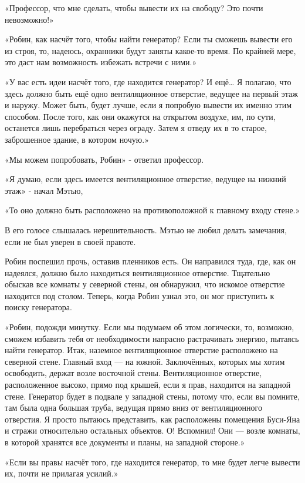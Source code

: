 \documentclass[a4paper,12pt]{book}
\begin{document}
\par
«Профессор, что мне сделать, чтобы вывести их на свободу? Это почти невозможно!»
\par
«Робин, как насчёт того, чтобы найти генератор? Если ты сможешь вывести его из строя, то, надеюсь, охранники будут заняты какое-то время. По крайней мере, это даст нам возможность избежать встречи с ними.»
\par
«У вас есть идеи насчёт того, где находится генератор? И ещё… Я полагаю, что здесь должно быть ещё одно вентиляционное отверстие, ведущее на первый этаж и наружу. Может быть, будет лучше, если я попробую вывести их именно этим способом. После того, как они окажутся на открытом воздухе, им, по сути, останется лишь перебраться через ограду. Затем я отведу их в то старое, заброшенное здание, в котором ночую.»
\par
«Мы можем попробовать, Робин» - ответил профессор.
\par
«Я думаю, если здесь имеется вентиляционное отверстие, ведущее на нижний этаж» - начал Мэтью,
\par
«То оно должно быть расположено на противоположной к главному входу стене.»
\par
В его голосе слышалась нерешительность. Мэтью не любил делать замечания, если не был уверен в своей правоте.
\par
Робин поспешил прочь, оставив пленников есть. Он направился туда, где, как он надеялся, должно было находиться вентиляционное отверстие. Тщательно обыскав все комнаты у северной стены, он обнаружил, что искомое отверстие находится под столом. Теперь, когда Робин узнал это, он мог приступить к поиску генератора.
\par
«Робин, подожди минутку. Если мы подумаем об этом логически, то, возможно, сможем избавить тебя от необходимости напрасно растрачивать энергию, пытаясь найти генератор. Итак, наземное вентиляционное отверстие расположено на северной стене. Главный вход — на южной. Заключённых, которых мы хотим освободить, держат возле восточной стены. Вентиляционное отверстие, расположенное высоко, прямо под крышей, если я прав, находится на западной стене. Генератор будет в подвале у западной стены, потому что, если вы помните, там была одна большая труба, ведущая прямо вниз от вентиляционного отверстия. Я просто пытаюсь представить, как расположены помещения Буси-Яна и стражи относительно остальных объектов. О! Вспомнил! Они — возле комнаты, в которой хранятся все документы и планы, на западной стороне.»
\par
«Если вы правы насчёт того, где находится генератор, то мне будет легче вывести их, почти не прилагая усилий.»\\
\end{document}
